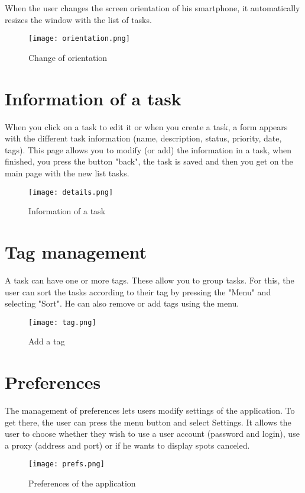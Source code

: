 When the user changes the screen orientation of his smartphone, it automatically resizes the window with the list of tasks.

\begin{figure}[!ht]
	\centering
    \texttt{[image: orientation.png]}
    \caption{Change of orientation}
\end{figure}

\section{Information of a task}

When you click on a task to edit it or when you create a task, a form appears with the different task information (name, description, status, priority, date, tags). This page allows you to modify (or add) the information in a task, when finished, you press the button "back", the task is saved and then you get on the main page with the new list tasks.

\begin{figure}[!ht]
	\centering
    \texttt{[image: details.png]}
    \caption{Information of a task}
\end{figure}

\section{Tag management}

A task can have one or more tags. These allow you to group tasks. For this, the user can sort the tasks according to their tag by pressing the "Menu" and selecting "Sort". He can also remove or add tags using the menu.

\begin{figure}[!ht]
	\centering
    \texttt{[image: tag.png]}
    \caption{Add a tag}
\end{figure}

\section{Preferences}

The management of preferences lets users modify settings of the application. To get there, the user can press the menu button and select Settings. It allows the user to choose whether they wish to use a user account (password and login), use a proxy (address and port) or if he wants to display spots canceled.

\begin{figure}[!ht]
	\centering
    \texttt{[image: prefs.png]}
    \caption{Preferences of the application}
\end{figure}

